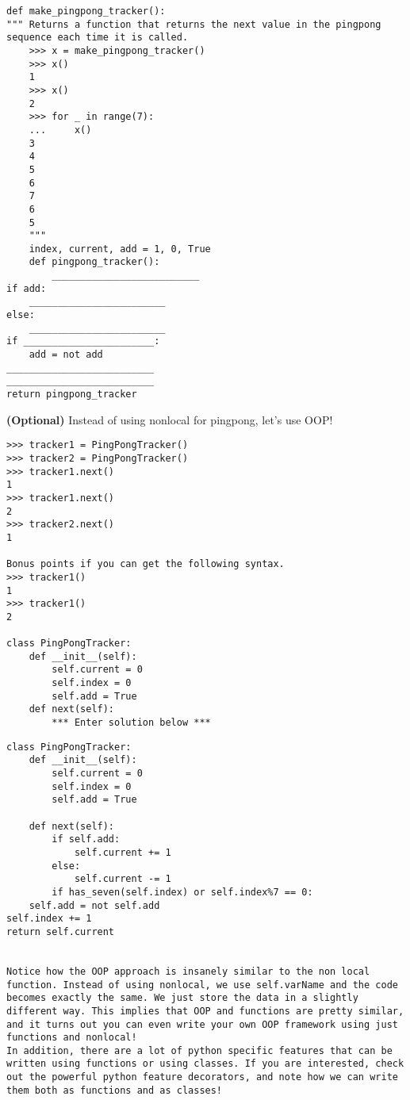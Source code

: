 \documentclass{exam}
\begin{document}
\begin{questions}
\begin{blocksection}
\begin{solution}[1in]
\begin{lstlisting}
def make_pingpong_tracker():
""" Returns a function that returns the next value in the pingpong sequence each time it is called. 
	>>> x = make_pingpong_tracker()
	>>> x()
	1
	>>> x()
	2
	>>> for _ in range(7):
	...		x()
	3
	4
	5
	6
	7
	6
	5
	"""
	index, current, add = 1, 0, True
	def pingpong_tracker():
		__________________________
if add:
	________________________
else:
	________________________
if _______________________:
	add = not add
__________________________
__________________________	
return pingpong_tracker

\end{lstlisting}
\end{solution}

\end{blocksection}

\begin{blocksection}
\question \textbf{(Optional)} Instead of using nonlocal for pingpong, let's use OOP!

\begin{lstlisting}
>>> tracker1 = PingPongTracker()
>>> tracker2 = PingPongTracker()
>>> tracker1.next()
1
>>> tracker1.next()
2
>>> tracker2.next()
1

Bonus points if you can get the following syntax.
>>> tracker1()
1
>>> tracker1()
2

class PingPongTracker:
    def __init__(self):
        self.current = 0
        self.index = 0
        self.add = True
    def next(self):
        *** Enter solution below ***
\end{lstlisting}

\begin{solution}[0.3in]
\begin{lstlisting}
class PingPongTracker:
	def __init__(self):
		self.current = 0
		self.index = 0
		self.add = True
	
	def next(self):
		if self.add:
			self.current += 1
		else:
			self.current -= 1
		if has_seven(self.index) or self.index%7 == 0:
	self.add = not self.add
self.index += 1
return self.current


Notice how the OOP approach is insanely similar to the non local function. Instead of using nonlocal, we use self.varName and the code becomes exactly the same. We just store the data in a slightly different way. This implies that OOP and functions are pretty similar, and it turns out you can even write your own OOP framework using just functions and nonlocal! 
In addition, there are a lot of python specific features that can be written using functions or using classes. If you are interested, check out the powerful python feature decorators, and note how we can write them both as functions and as classes!
\end{lstlisting}
\end{solution}

\end{blocksection}

\end{questions}

\end{document}
